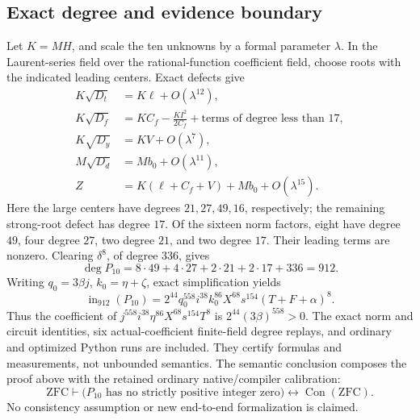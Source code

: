 \subsection{Exact degree and evidence boundary}

Let $K=MH$, and scale the ten unknowns by a formal parameter $\lambda$.
In the Laurent-series field over the rational-function coefficient field,
choose roots with the indicated leading centers. Exact defects give
\begin{align*}
 K\sqrt{D_t}&=K\ell+O(\lambda^{12}),\\
 K\sqrt{D_f}&=KC_f-\frac{KI^2}{2C_f}
                  +\text{terms of degree less than }17,\\
 K\sqrt{D_y}&=KV+O(\lambda^7),\\
 M\sqrt{D_d}&=Mb_0+O(\lambda^{11}),\\
 Z&=K(\ell+C_f+V)+Mb_0+O(\lambda^{15}).
\end{align*}
Here the large centers have degrees $21,27,49,16$, respectively; the
remaining strong-root defect has degree $17$. Of the sixteen norm factors,
eight have degree $49$, four degree $27$, two degree $21$, and two degree
$17$. Their leading terms are nonzero. Clearing $\delta^8$, of degree
$336$, gives
\[
 \deg P_{10}=8\cdot49+4\cdot27+2\cdot21+2\cdot17+336=912.
\]
Writing $q_0=3\beta j$, $k_0=\eta+\zeta$, exact simplification yields
\[
 \operatorname{in}_{912}(P_{10})=
 2^{44}q_0^{558}i^{38}k_0^{86}X^{68}s^{154}(T+F+\alpha)^8.
\]
Thus the coefficient of $j^{558}i^{38}\eta^{86}X^{68}s^{154}T^8$ is
$2^{44}(3\beta)^{558}>0$. The exact norm and circuit identities, six
actual-coefficient finite-field degree replays, and ordinary and optimized
Python runs are included. They certify formulas and measurements, not
unbounded semantics. The semantic conclusion composes the proof above
with the retained ordinary native/compiler calibration:
\[
 \mathrm{ZFC}\vdash
 \bigl(\text{$P_{10}$ has no strictly positive integer zero}\bigr)
 \longleftrightarrow\operatorname{Con}(\mathrm{ZFC}).
\]
No consistency assumption or new end-to-end formalization is claimed.
